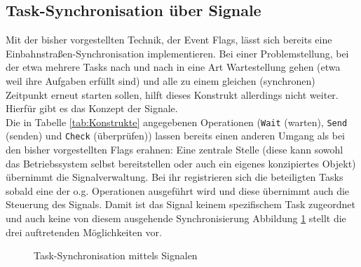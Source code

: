 \documentclass{llncs}
\begin{document}
\subsection{Task-Synchronisation über Signale}
\label{subsec:Task_Synchronisation_Signale}
Mit der bisher vorgestellten Technik, der Event Flags, lässt sich bereits eine Einbahnstraßen-Synchronisation implementieren. Bei einer Problemstellung, bei der etwa mehrere Tasks nach und nach in eine Art Wartestellung gehen (etwa weil ihre Aufgaben erfüllt sind) und alle zu einem gleichen (synchronen) Zeitpunkt erneut starten sollen, hilft dieses Konstrukt allerdings nicht weiter. Hierfür gibt es das Konzept der Signale.\\

Die in Tabelle \ref{tab:Konstrukte} angegebenen Operationen (\texttt{Wait} (warten), \texttt{Send} (senden) und \texttt{Check} (überprüfen)) lassen bereits einen anderen Umgang als bei den bisher vorgestellten Flags erahnen: Eine zentrale Stelle (diese kann sowohl das Betriebssystem selbst bereitstellen oder auch ein eigenes konzipiertes Objekt) übernimmt die Signalverwaltung. Bei ihr registrieren sich die beteiligten Tasks sobald eine der o.g. Operationen ausgeführt wird und diese übernimmt auch die Steuerung des Signals. Damit ist das Signal keinem spezifischem Task zugeordnet und auch keine von diesem ausgehende Synchronisierung \autocite[vgl.][91]{Cooling2017} Abbildung \ref{fig:Signale_gesamt} stellt die drei auftretenden Möglichkeiten vor.

\begin{figure}[h]
	\centering
	\begin{subfigure}{.40\columnwidth} %
		\def\svgwidth{\columnwidth}
		
	\end{subfigure}
	\caption{\label{fig:Signale_gesamt}Task-Synchronisation mittels Signalen \autocite[vgl.][90]{Cooling2017}}
\end{figure}
\end{document}
